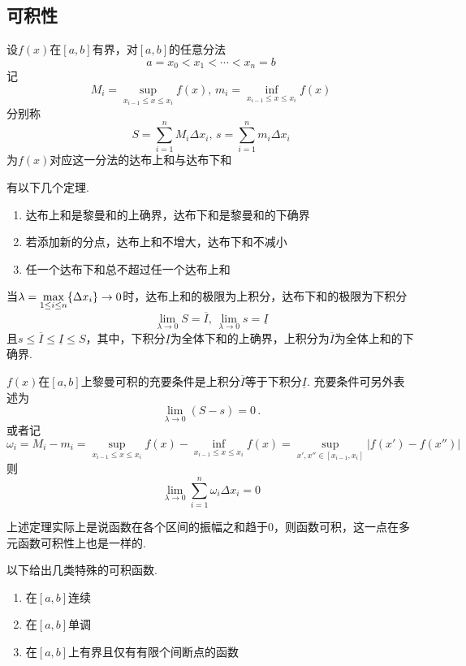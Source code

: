 \subsection{可积性}
\begin{definition}[达布(Darboux)和]
设$f(x)$在$[a,b]$有界，对$[a,b]$的任意分法
\[a=x_0<x_1<\cdots<x_n=b\]
记
\[M_i=\sup_{x_{i-1}\leq x\leq x_i}f(x),\,m_i=\inf_{x_{i-1}\leq x\leq x_i}f(x)\]
分别称
\[S=\sum_{i=1}^nM_i\Delta x_i,\,s=\sum_{i=1}^nm_i\Delta x_i\]
为$f(x)$对应这一分法的达布上和与达布下和
\end{definition}
\par 有以下几个定理.
\begin{theorem}\mbox{}\par
\begin{enumerate}
	\itemsep-3pt
	\item 达布上和是黎曼和的上确界，达布下和是黎曼和的下确界
	\item 若添加新的分点，达布上和不增大，达布下和不减小
	\item 任一个达布下和总不超过任一个达布上和
\end{enumerate}
\end{theorem}
\begin{theorem}[达布定理]
当$\displaystyle\lambda=\max_{1\leq i\leq n}\{\Delta x_i\}\to 0$时，达布上和的极限为上积分，达布下和的极限为下积分
\[\lim_{\lambda\to 0}S=\overline{I},\,\lim_{\lambda\to 0}s=\underline{I}\]
且$s\leq\overline{I}\leq\underline{I}\leq S$，其中，下积分$\underline{I}$为全体下和的上确界，上积分为$\overline{I}$为全体上和的下确界.
\end{theorem}
\begin{theorem}[可积的充要条件]
\label{thm:integrality}
$f(x)$在$[a,b]$上黎曼可积的充要条件是上积分$\overline{I}$等于下积分$\underline{I}$.
充要条件可另外表述为
\[\lim_{\lambda\to 0}(S-s)=0\,.\]
或者记
\[\omega_i=M_i-m_i=\sup_{x_{i-1}\leq x\leq x_i}f(x)-\inf_{x_{i-1}\leq x\leq x_i}f(x)=\sup_{x',x''\in[x_{i-1},x_i]}|f(x')-f(x'')|\]
则
\[\lim_{\lambda\to 0}\sum_{i=1}^n\omega_i\Delta x_i=0\]
\end{theorem}
\par 上述定理实际上是说函数在各个区间的振幅之和趋于$0$，则函数可积，这一点在多元函数可积性上也是一样的.
\par 以下给出几类特殊的可积函数.
\begin{enumerate}
	\itemsep -3pt
	\item 在$[a,b]$连续
	\item 在$[a,b]$单调
	\item 在$[a,b]$上有界且仅有有限个间断点的函数
\end{enumerate}
